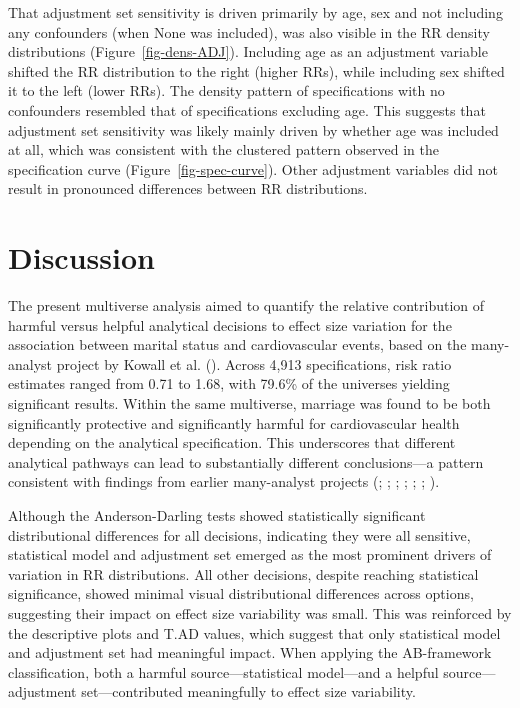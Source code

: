 \documentclass[
  man,
  floatsintext,
  longtable,
  nolmodern,
  notxfonts,
  notimes,
  colorlinks=true,linkcolor=blue,citecolor=blue,urlcolor=blue]{apa7}
\begin{document}
\newpage

That adjustment set sensitivity is driven primarily by age, sex and not
including any confounders (when None was included), was also visible in
the RR density distributions (Figure~\ref{fig-dens-ADJ}). Including age
as an adjustment variable shifted the RR distribution to the right
(higher RRs), while including sex shifted it to the left (lower RRs).
The density pattern of specifications with no confounders resembled that
of specifications excluding age. This suggests that adjustment set
sensitivity was likely mainly driven by whether age was included at all,
which was consistent with the clustered pattern observed in the
specification curve (Figure~\ref{fig-spec-curve}). Other adjustment
variables did not result in pronounced differences between RR
distributions.

\newpage

\section{Discussion}\label{discussion}

The present multiverse analysis aimed to quantify the relative
contribution of harmful versus helpful analytical decisions to effect
size variation for the association between marital status and
cardiovascular events, based on the many-analyst project by Kowall et
al. (). Across 4,913
specifications, risk ratio estimates ranged from 0.71 to 1.68, with
79.6\% of the universes yielding significant results. Within the same
multiverse, marriage was found to be both significantly protective and
significantly harmful for cardiovascular health depending on the
analytical specification. This underscores that different analytical
pathways can lead to substantially different conclusions---a pattern
consistent with findings from earlier many-analyst projects
(;
; ;
;
; ; ).

Although the Anderson-Darling tests showed statistically significant
distributional differences for all decisions, indicating they were all
sensitive, statistical model and adjustment set emerged as the most
prominent drivers of variation in RR distributions. All other decisions,
despite reaching statistical significance, showed minimal visual
distributional differences across options, suggesting their impact on
effect size variability was small. This was reinforced by the
descriptive plots and T.AD values, which suggest that only statistical
model and adjustment set had meaningful impact. When applying the
AB-framework classification, both a harmful source---statistical
model---and a helpful source---adjustment set---contributed meaningfully
to effect size variability.
\end{document}

